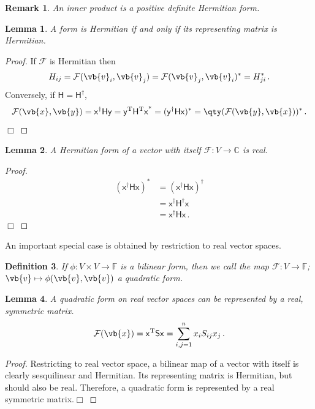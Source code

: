 \documentclass{article}
\theoremstyle{plain}\theoremheaderfont{\normalfont\itshape}\theorembodyfont{\rmfamily}\theoremseparator{.}\newtheorem*{rem}{Remark}\newtheorem*{ex}{Example}\newtheorem*{proof}{Proof}\newtheorem*{altp}{Alternative proof}
\theoremstyle{plain}\theoremheaderfont{\normalfont\bfseries}\theorembodyfont{\rmfamily}\theoremseparator{.}\newtheorem{thm}{Theorem}[section]\newtheorem{lem}[thm]{Lemma}\newtheorem{prop}[thm]{Proposition}\newtheorem*{cor}{Corollary}\newtheorem{defn}[thm]{Definition}\newtheorem{clm}[thm]{Claim}\newtheorem{clminproof}{Claim}
\theoremstyle{break}\theoremheaderfont{\normalfont\itshape}\theorembodyfont{\rmfamily}\theoremseparator{.\medskip}\newtheorem*{proofskip}{Proof}\newtheorem*{exs}{Examples}\newtheorem*{rems}{Remarks}
\theoremstyle{break}\theoremheaderfont{\normalfont\bfseries}\theorembodyfont{\rmfamily}\theoremseparator{.\medskip}\newtheorem{lemskip}[thm]{Lemma}\newtheorem{defnskip}[thm]{Definition}\newtheorem{propskip}[thm]{Proposition}\newtheorem{thmskip}[thm]{Theorem}
\numberwithin{equation}{section}
\newcommand{\qed}{\hfill\ensuremath{\Box}}
\newcommand{\tp}{^\mathrm{T}}
\begin{document}
	\begin{rem}
		An inner product is a positive definite Hermitian form.
	\end{rem}
	\begin{lem}
		A form is Hermitian if and only if its representing matrix is Hermitian.
	\end{lem}
	\begin{proof}
		If \(\mathcal{F}\) is Hermitian then
		\[H_{ij}=\mathcal{F}(\vb{v}_i,\vb{v}_j)=\mathcal{F}(\vb{v}_j,\vb{v}_i)^*=H_{ji}^*\,.\]
		Conversely, if \(\mathsf{H}=\mathsf{H}^\dagger\),
		\[\mathcal{F}(\vb{x},\vb{y})=\mathsf{x^\dagger Hy}=\mathsf{y\tp H\tp x}^*=(\mathsf{y^\dagger Hx})^*=\qty(\mathcal{F}(\vb{y},\vb{x}))^*\,.\]\qed
	\end{proof}
	\begin{lem}
		A Hermitian form of a vector with itself \(\mathcal{F}:V\to\mathbb{C}\) is real.
	\end{lem}
	\begin{proof}
		\begin{align*}
			(\mathsf{x^\dagger Hx})^*&=(\mathsf{x^\dagger Hx})^\dagger\\
			&=\mathsf{x^\dagger H^\dagger x}\\
			&=\mathsf{x^\dagger H x}\,.
		\end{align*}\qed
	\end{proof}
	
	An important special case is obtained by restriction to real vector spaces.
	\begin{defn}
		If \(\phi:V\times V\to\mathbb{F}\) is a bilinear form, then we call the map \(\mathcal{F}: V\to\mathbb{F}\); \(\vb{v}\mapsto\phi(\vb{v},\vb{v})\) a \textit{quadratic form}.
	\end{defn}
	\begin{lem}
		A quadratic form on real vector spaces can be represented by a real, symmetric matrix.
		\[\mathcal{F}(\vb{x})=\mathsf{x}\tp\mathsf{Sx}=\sum_{i,j=1}^{n}x_iS_{ij}x_j\,.\]
	\end{lem}
	\begin{proof}
		Restricting to real vector space, a bilinear map of a vector with itself is clearly sesquilinear and Hermitian. Its representing matrix is Hermitian, but should also be real. Therefore, a quadratic form is represented by a real symmetric matrix.\qed 
	\end{proof}
	
\end{document}
